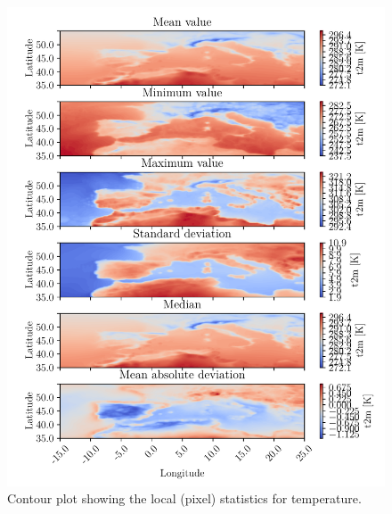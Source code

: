 \begin{figure}[ht]
    \centering
    \includegraphics{python_figs/all_stat_variable_t2m.pdf}
    \caption{Contour plot showing the local (pixel) statistics for temperature.}
    \label{fig:all_stats_t2m}
\end{figure}

